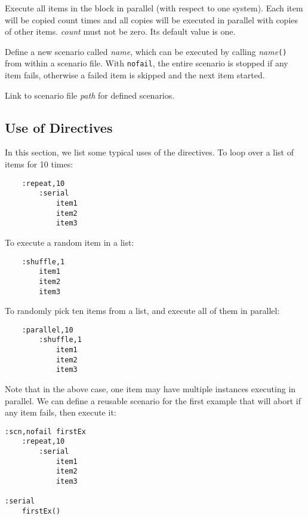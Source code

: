 Execute all items in the block in parallel (with respect to one system). Each
item will be copied count times and all copies will be executed in parallel with
copies of other items. {\it count} must not be zero. Its default value is one.


Define a new scenario called {\it name}, which can be executed by calling {\it
name}{\tt ()} from within a scenario file. With {\tt nofail}, the entire
scenario is stopped if any item fails, otherwise a failed item is skipped and
the next item started.


 Link to scenario file {\it path} for defined
scenarios.

\subsection{Use of Directives}

In this section, we list some typical uses of the directives. To loop over a
list of items for 10 times:
\begin{verbatim}
    :repeat,10
        :serial
            item1
            item2
            item3
\end{verbatim}
To execute a random item in a list:
\begin{verbatim}
    :shuffle,1
        item1
        item2
        item3
\end{verbatim}
To randomly pick ten items from a list, and execute all of them in parallel:
\begin{verbatim}
    :parallel,10
        :shuffle,1
            item1
            item2
            item3
\end{verbatim}
Note that in the above case, one item may have multiple instances executing in
parallel. We can define a reusable scenario for the first example that will
abort if any item fails, then execute it:
\begin{verbatim}
:scn,nofail firstEx
    :repeat,10
        :serial
            item1
            item2
            item3

:serial
    firstEx()
\end{verbatim}

